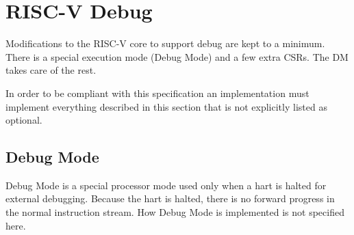 \chapter{RISC-V Debug}
\label{sec:core_debug}

Modifications to the RISC-V core to support debug are kept to a minimum.  There
is a special execution mode (Debug Mode) and a few extra CSRs. The DM takes care
of the rest.

In order to be compliant with this specification an implementation must
implement everything described in this section that is not explicitly listed as
optional.

\section{Debug Mode} \label{debugmode}

Debug Mode is a special processor mode used only when a hart is halted for
external debugging. Because the hart is halted, there is no forward progress in
the normal instruction stream.
How Debug Mode is implemented is not specified here.

